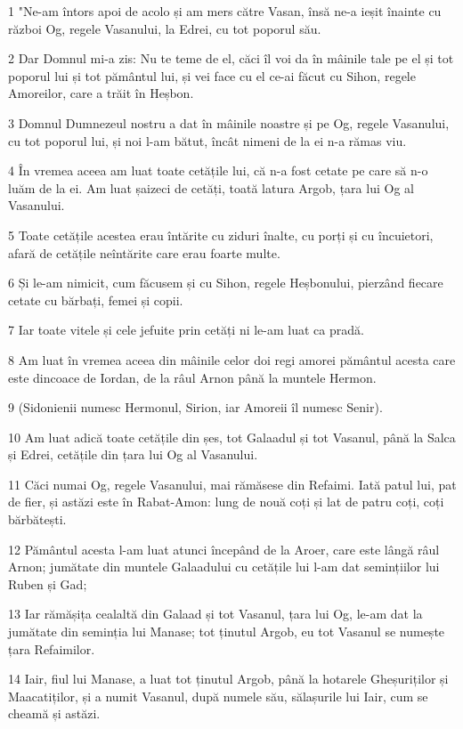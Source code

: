 \par 1 "Ne-am întors apoi de acolo și am mers către Vasan, însă ne-a ieșit înainte cu război Og, regele Vasanului, la Edrei, cu tot poporul său.
\par 2 Dar Domnul mi-a zis: Nu te teme de el, căci îl voi da în mâinile tale pe el și tot poporul lui și tot pământul lui, și vei face cu el ce-ai făcut cu Sihon, regele Amoreilor, care a trăit în Heșbon.
\par 3 Domnul Dumnezeul nostru a dat în mâinile noastre și pe Og, regele Vasanului, cu tot poporul lui, și noi l-am bătut, încât nimeni de la ei n-a rămas viu.
\par 4 În vremea aceea am luat toate cetățile lui, că n-a fost cetate pe care să n-o luăm de la ei. Am luat șaizeci de cetăți, toată latura Argob, țara lui Og al Vasanului.
\par 5 Toate cetățile acestea erau întărite cu ziduri înalte, cu porți și cu încuietori, afară de cetățile neîntărite care erau foarte multe.
\par 6 Și le-am nimicit, cum făcusem și cu Sihon, regele Heșbonului, pierzând fiecare cetate cu bărbați, femei și copii.
\par 7 Iar toate vitele și cele jefuite prin cetăți ni le-am luat ca pradă.
\par 8 Am luat în vremea aceea din mâinile celor doi regi amorei pământul acesta care este dincoace de Iordan, de la râul Arnon până la muntele Hermon.
\par 9 (Sidonienii numesc Hermonul, Sirion, iar Amoreii îl numesc Senir).
\par 10 Am luat adică toate cetățile din șes, tot Galaadul și tot Vasanul, până la Salca și Edrei, cetățile din țara lui Og al Vasanului.
\par 11 Căci numai Og, regele Vasanului, mai rămăsese din Refaimi. Iată patul lui, pat de fier, și astăzi este în Rabat-Amon: lung de nouă coți și lat de patru coți, coți bărbătești.
\par 12 Pământul acesta l-am luat atunci începând de la Aroer, care este lângă râul Arnon; jumătate din muntele Galaadului cu cetățile lui l-am dat semințiilor lui Ruben și Gad;
\par 13 Iar rămășița cealaltă din Galaad și tot Vasanul, țara lui Og, le-am dat la jumătate din seminția lui Manase; tot ținutul Argob, eu tot Vasanul se numește țara Refaimilor.
\par 14 Iair, fiul lui Manase, a luat tot ținutul Argob, până la hotarele Gheșuriților și Maacatiților, și a numit Vasanul, după numele său, sălașurile lui Iair, cum se cheamă și astăzi.

